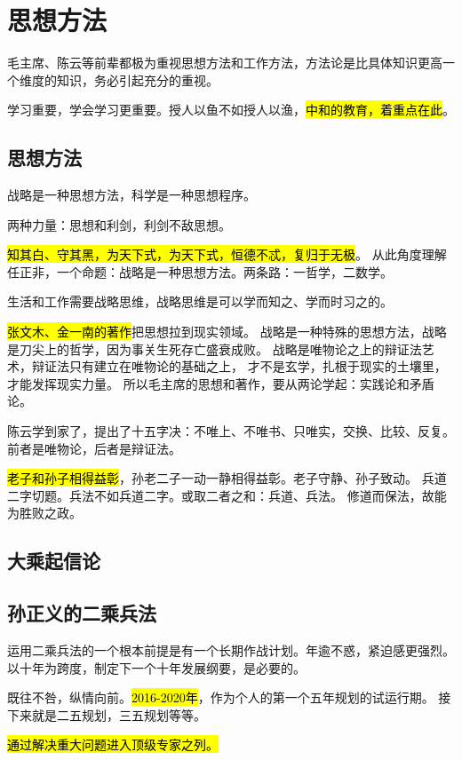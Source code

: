 \chapter{思想方法}

毛主席、陈云等前辈都极为重视思想方法和工作方法，方法论是比具体知识更高一个维度的知识，务必引起充分的重视。

学习重要，学会学习更重要。授人以鱼不如授人以渔，\hl{中和的教育，着重点在此}。

\section{思想方法}

战略是一种思想方法，科学是一种思想程序。

两种力量：思想和利剑，利剑不敌思想。

\hl{知其白、守其黑，为天下式，为天下式，恒德不忒，复归于无极}。
从此角度理解任正非，一个命题：战略是一种思想方法。两条路：一哲学，二数学。

生活和工作需要战略思维，战略思维是可以学而知之、学而时习之的。

\hl{张文木、金一南的著作}把思想拉到现实领域。
战略是一种特殊的思想方法，战略是刀尖上的哲学，因为事关生死存亡盛衰成败。
战略是唯物论之上的辩证法艺术，辩证法只有建立在唯物论的基础之上，
才不是玄学，扎根于现实的土壤里，才能发挥现实力量。
所以毛主席的思想和著作，要从两论学起：实践论和矛盾论。

陈云学到家了，提出了十五字决：不唯上、不唯书、只唯实，交换、比较、反复。
前者是唯物论，后者是辩证法。

\hl{老子和孙子相得益彰}，孙老二子一动一静相得益彰。老子守静、孙子致动。
兵道二字切题。兵法不如兵道二字。或取二者之和：兵道、兵法。
修道而保法，故能为胜败之政。

\section{大乘起信论}

\section{孙正义的二乘兵法}

运用二乘兵法的一个根本前提是有一个长期作战计划。年逾不惑，紧迫感更强烈。
以十年为跨度，制定下一个十年发展纲要，是必要的。

既往不咎，纵情向前。\hl{2016-2020年}，作为个人的第一个五年规划的试运行期。
接下来就是二五规划，三五规划等等。

\hl{通过解决重大问题进入顶级专家之列。}

